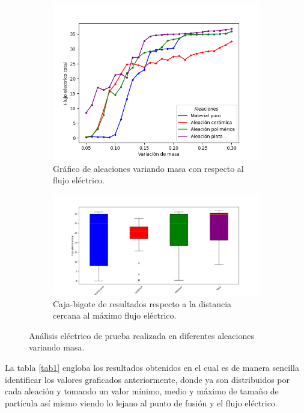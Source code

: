 \documentclass[3pt,twocolumn]{elsarticle}
\begin{document}
\begin{figure}[H]
\centering
\begin{subfigure}[b]{1\linewidth}
\includegraphics[width=\columnwidth]{elec_masa.png}
\caption{Gráfico de aleaciones variando masa con respecto al flujo eléctrico.}
\end{subfigure}
\begin{subfigure}[b]{1\linewidth}
\includegraphics[width=\columnwidth]{CB_elec_masa.png}
\caption{Caja-bigote de resultados respecto a la distancia cercana al máximo flujo eléctrico.}
\end{subfigure}
\caption{Análisis eléctrico de prueba realizada en diferentes aleaciones variando masa.}
\label{fig5}
\end{figure}

La tabla \ref{tab1} engloba los resultados obtenidos en el cual es de manera sencilla identificar los valores graficados anteriormente, donde ya son distribuidos por cada aleación y tomando un valor mínimo, medio y máximo de tamaño de partícula así mismo viendo lo lejano al punto de fusión y el flujo eléctrico.
\end{document}
